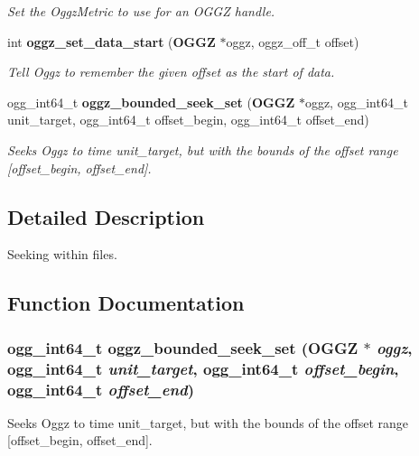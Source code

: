 \begin{DoxyCompactItemize}
\begin{DoxyCompactList}\small\item\em Set the OggzMetric to use for an OGGZ handle. \item\end{DoxyCompactList}\item 
int {\bf oggz\_\-set\_\-data\_\-start} ({\bf OGGZ} $\ast$oggz, oggz\_\-off\_\-t offset)
\begin{DoxyCompactList}\small\item\em Tell Oggz to remember the given offset as the start of data. \item\end{DoxyCompactList}\item 
ogg\_\-int64\_\-t {\bf oggz\_\-bounded\_\-seek\_\-set} ({\bf OGGZ} $\ast$oggz, ogg\_\-int64\_\-t unit\_\-target, ogg\_\-int64\_\-t offset\_\-begin, ogg\_\-int64\_\-t offset\_\-end)
\begin{DoxyCompactList}\small\item\em Seeks Oggz to time unit\_\-target, but with the bounds of the offset range [offset\_\-begin, offset\_\-end]. \item\end{DoxyCompactList}\end{DoxyCompactItemize}


\subsection{Detailed Description}
Seeking within files. 

\subsection{Function Documentation}
\subsubsection[{oggz\_\-bounded\_\-seek\_\-set}]{\setlength{\rightskip}{0pt plus 5cm}ogg\_\-int64\_\-t oggz\_\-bounded\_\-seek\_\-set ({\bf OGGZ} $\ast$ {\em oggz}, \/  ogg\_\-int64\_\-t {\em unit\_\-target}, \/  ogg\_\-int64\_\-t {\em offset\_\-begin}, \/  ogg\_\-int64\_\-t {\em offset\_\-end})}\label{oggz__seek_8h_a116cf4ae056573ab69b1161671ff6c59}


Seeks Oggz to time unit\_\-target, but with the bounds of the offset range [offset\_\-begin, offset\_\-end]. 

